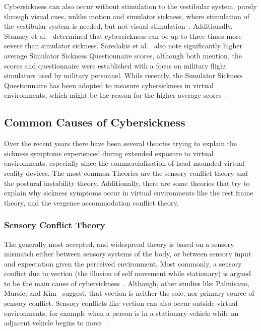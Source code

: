 Cybersickness can also occur without stimulation to the vestibular system, purely through visual cues, unlike motion
and simulator sickness, where stimulation of the vestibular system is needed, but not visual stimulation~\cite{LaViola2000}.
Additionally, Stanney et al.~\cite{Stanney1997} determined that cybersickness can be up to three times more severe
than simulator sickness.
Saredakis et al.~\cite{Saredakis2020} also note significantly higher average Simulator Sickness Questionnaire scores,
although both mention, the scores and questionnaire were established with a focus on military flight simulators used
by military personnel.
While recently, the Simulator Sickness Questionnaire has been adopted to measure cybersickness in virtual
environments, which might be the reason for the higher average scores~\cite{Saredakis2020}.


\subsection{Common Causes of Cybersickness}\label{subsec:common-causes-of-cybersickness}

Over the recent years there have been several theories trying to explain the sickness symptoms experienced during
extended exposure to virtual environments, especially since the commercialisation of head-mounded virtual reality
devices.
The most common Theories are the sensory conflict theory and the postural instability theory.
Additionally, there are some theories that try to explain why sickness symptoms occur in virtual environments like the
rest frame theory, and the vergence accommodation conflict theory.


\subsubsection{Sensory Conflict Theory}\label{subsubsec:sensory-conflict-theory}

The generally most accepted, and widespread theory is based on a sensory mismatch either between sensory systems of the
body, or between sensory input and expectation given the perceived environment.
Most commonly, a sensory conflict due to vection (the illusion of self movement while stationary) is argued to be the
main cause of cybersickness~\cite{Weech2018,Keshavarz2019}.
Although, other studies like Palmisano, Mursic, and Kim~\cite{Palmisano2017} suggest, that vection is neither the
sole, nor primary source of sensory conflict.
Sensory conflicts like vection can also occur outside virtual environments, for example when a person is in a
stationary vehicle while an adjacent vehicle begins to move~\cite{LaViola2000}.

